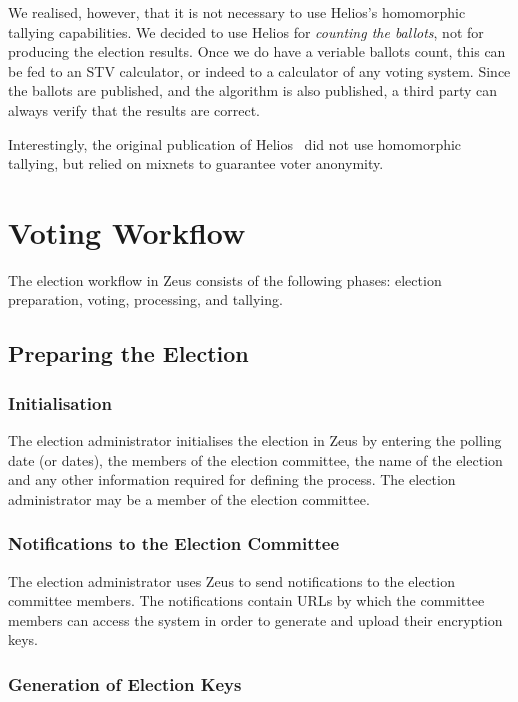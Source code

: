 \documentclass[letterpaper,10pt]{article}
\begin{document}
We realised, however, that it is not necessary to use Helios's
homomorphic tallying capabilities. We decided to use Helios for
\emph{counting the ballots}, not for producing the election results.
Once we do have a veriable ballots count, this can be fed to an STV
calculator, or indeed to a calculator of any voting system. Since the
ballots are published, and the algorithm is also published, a third
party can always verify that the results are correct.

Interestingly, the original publication of Helios~\cite{adida:2008}
did not use homomorphic tallying, but relied on mixnets to
guarantee voter anonymity. ~\cite{bulens:2011}

\section{Voting Workflow}
\label{workflow}

The election workflow in Zeus consists of the following phases:
election preparation, voting, processing, and tallying.

\subsection{Preparing the Election}

\subsubsection{Initialisation}

The election administrator initialises the election in Zeus by
entering the polling date (or dates), the members of the election
committee, the name of the election and any other information required
for defining the process. The election administrator may be a member
of the election committee.

\subsubsection{Notifications to the Election Committee}

The election administrator uses Zeus to send notifications to the
election committee members. The notifications contain URLs by which
the committee members can access the system in order to generate and
upload their encryption keys.

\subsubsection{Generation of Election Keys}
\end{document}
